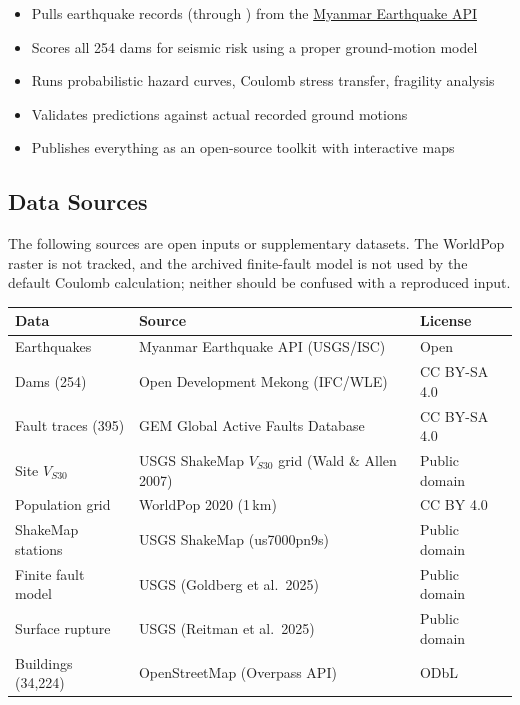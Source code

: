 \documentclass[11pt,a4paper]{article}
\begin{document}
\begin{itemize}
    \item Pulls \CatalogCount{} earthquake records (through \CatalogLatest) from the \href{https://mmeq.akze.net}{Myanmar Earthquake API}
    \item Scores all 254 dams for seismic risk using a proper ground-motion model
    \item Runs probabilistic hazard curves, Coulomb stress transfer, fragility analysis
    \item Validates predictions against actual recorded ground motions
    \item Publishes everything as an open-source toolkit with interactive maps
\end{itemize}

\subsection{Data Sources}

The following sources are open inputs or supplementary datasets. The WorldPop
raster is not tracked, and the archived finite-fault model is not used by the
default Coulomb calculation; neither should be confused with a reproduced input.

\begin{table}[htbp]
\centering\small
\begin{tabular}{@{}lll@{}}
\toprule
\textbf{Data} & \textbf{Source} & \textbf{License} \\
\midrule
Earthquakes & Myanmar Earthquake API (USGS/ISC) & Open \\
Dams (254) & Open Development Mekong (IFC/WLE) & CC BY-SA 4.0 \\
Fault traces (395) & GEM Global Active Faults Database & CC BY-SA 4.0 \\
Site $V_{S30}$ & USGS ShakeMap $V_{S30}$ grid (Wald \& Allen 2007) & Public domain \\
Population grid & WorldPop 2020 (1\,km) & CC BY 4.0 \\
ShakeMap stations & USGS ShakeMap (us7000pn9s) & Public domain \\
Finite fault model & USGS (Goldberg et al.\ 2025) & Public domain \\
Surface rupture & USGS (Reitman et al.\ 2025) & Public domain \\
Buildings (34,224) & OpenStreetMap (Overpass API) & ODbL \\
\bottomrule
\end{tabular}
\end{table}
\end{document}
